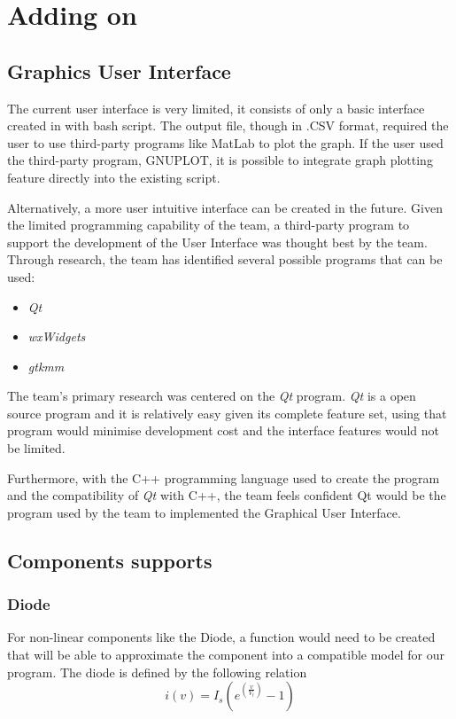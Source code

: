 \documentclass[12pt,a4paper]{article}
\begin{document}
\pagebreak

\section{Adding on}
\subsection{Graphics User Interface}
The current user interface is very limited, it consists of only a basic interface created
in with bash script. The output file, though in .CSV format, required the user to 
use third-party programs like MatLab to plot the graph. If the user used the third-party
program, GNUPLOT, it is possible to integrate graph plotting feature directly into the existing 
script. 
\par 
Alternatively, a more user intuitive interface can be created in the future. Given the 
limited programming capability of the team, a third-party program to support the 
development of the User Interface was thought best by the team. Through research, the 
team has identified several possible programs that can be used:
\begin{itemize}
	\item \textit{Qt}
	\item \textit{wxWidgets}
	\item \textit{gtkmm}
\end{itemize}
The team's primary research was centered on the \textit{Qt} program. \textit{Qt} is a open
source program and it is relatively easy given its complete feature set, using that program
would minimise development cost and the interface features would not be limited.

Furthermore, with the C++ programming language used to create the program and the compatibility
of \textit{Qt} with C++, the team feels confident Qt would be the program used by the team
to implemented the Graphical User Interface.

\subsection{Components supports}
\subsubsection{Diode}
For non-linear components like the Diode, a function would need to be created that will be able to 
approximate the component into a compatible model for our program. The diode is defined by the 
following relation $$i(v)=I_s(e^{(\frac{v}{V_t})}-1)$$
\end{document}
